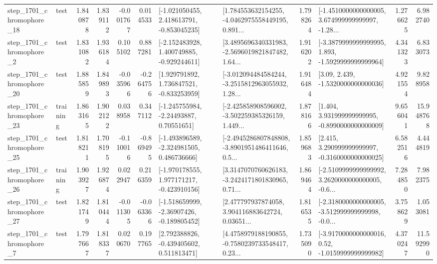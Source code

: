 \begin{tabular}{llrrrrllrlrr}
 step\_1701\_chromophore\_18 &      test &      1.840878 &    1.839112 &     -0.001767 &  0.014533 &   [-1.021050455, 2.418613791, -0.853045235] &  [1.784553632154255, -4.0462975558449195, 0.891... &       1.798264 &  [-1.4510000000000005, 3.674999999999997, -1.28... &            1.276625 &          6.982740 \\
  step\_1701\_chromophore\_2 &      test &      1.831082 &    1.936184 &      0.105102 &  0.887281 &   [-2.152483928, 1.400749885, -0.929244611] &  [3.4895696340331983, -2.5696019821847482, 1.64... &       1.916202 &  [-3.3879999999999995, 1.893, -1.5929999999999964] &            4.341323 &          6.833073 \\
 step\_1701\_chromophore\_20 &      test &      1.885859 &    1.849893 &     -0.035966 & -0.264756 &    [1.929791892, 1.736847521, -0.833253959] &  [-3.012094484584244, -3.2515812963055932, 1.28... &       1.916484 &                 [3.09, 2.439, -1.5320000000000036] &            4.921554 &          9.828958 \\
 step\_1701\_chromophore\_23 &  training &      1.863165 &    1.902122 &      0.038958 &  0.347112 &     [-1.245755984, -2.24493887, 0.70551651] &  [-2.425858908596002, -3.502259385326159, 1.449... &       1.878166 &    [1.404, 3.931999999999995, -0.8990000000000009] &            9.656041 &         15.948768 \\
 step\_1701\_chromophore\_25 &      test &      1.818211 &    1.708195 &     -0.110016 & -0.869495 &   [-1.493896589, -2.324981505, 0.486736666] &  [-2.4945286807848808, -3.8901951486411646, 0.5... &       1.859683 &    [2.415, 3.290999999999997, -0.3160000000000025] &            6.582516 &          4.444819 \\
 step\_1701\_chromophore\_26 &  training &      1.903927 &    1.926874 &      0.022947 &  0.216359 &   [-1.970178555, 1.977171217, -0.423910156] &  [3.3147070760626183, -3.2424171801830965, 0.71... &       1.869464 &  [-2.5109999999999992, 3.2620000000000005, -0.6... &            7.284850 &          7.982375 \\
 step\_1701\_chromophore\_27 &      test &      1.821749 &    1.810444 &     -0.011305 & -0.063366 &   [-1.518659999, -2.36907426, -0.189805452] &  [2.477797937874058, 3.904116883642724, 0.03651... &       1.816535 &  [-2.3180000000000005, -3.512999999999998, -0.0... &            3.758629 &          1.053081 \\
  step\_1701\_chromophore\_7 &      test &      1.797667 &    1.818337 &      0.020670 &  0.197765 &    [2.792388826, -0.439405602, 0.511813471] &  [4.4758979188190855, -0.7580239733548417, 0.23... &       1.735090 &   [-3.9170000000000016, 0.52, -1.0159999999999982] &            4.370247 &         11.592990 \\

\end{tabular}
